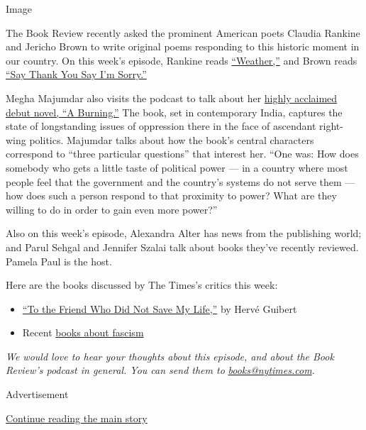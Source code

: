 Image

The Book Review recently asked the prominent American poets Claudia
Rankine and Jericho Brown to write original poems responding to this
historic moment in our country. On this week's episode, Rankine reads
\href{https://www.nytimes.com/2020/06/15/books/review/claudia-rankine-weather-poem-coronavirus.html}{``Weather,''}
and Brown reads
\href{https://www.nytimes.com/2020/06/15/books/review/jericho-brown-say-thank-you-say-im-sorry-poem-coronavirus.html}{``Say
Thank You Say I'm Sorry.''}

Megha Majumdar also visits the podcast to talk about her
\href{https://www.nytimes.com/2020/06/08/books/review/a-burning-megha-majumdar.html}{highly
acclaimed debut novel, ``A Burning.''} The book, set in contemporary
India, captures the state of longstanding issues of oppression there in
the face of ascendant right-wing politics. Majumdar talks about how the
book's central characters correspond to ``three particular questions''
that interest her. ``One was: How does somebody who gets a little taste
of political power --- in a country where most people feel that the
government and the country's systems do not serve them --- how does such
a person respond to that proximity to power? What are they willing to do
in order to gain even more power?''

Also on this week's episode, Alexandra Alter has news from the
publishing world; and Parul Sehgal and Jennifer Szalai talk about books
they've recently reviewed. Pamela Paul is the host.

Here are the books discussed by The Times's critics this week:

\begin{itemize}
\item
  \href{https://www.nytimes.com/2020/06/08/books/review-herve-guibert-to-friend-who-did-not-save-my-life-written-in-invisible-ink.html}{``To
  the Friend Who Did Not Save My Life,''} by Hervé Guibert
\item
  Recent
  \href{https://www.nytimes.com/2020/06/10/books/fascism-debate-donald-trump.html}{books
  about fascism}
\end{itemize}

\emph{We would love to hear your thoughts about this episode, and about
the Book Review's podcast in general. You can send them to}
\href{mailto:books@nytimes.com}{\emph{books@nytimes.com}}\emph{.}

Advertisement

\protect\hyperlink{after-bottom}{Continue reading the main story}

